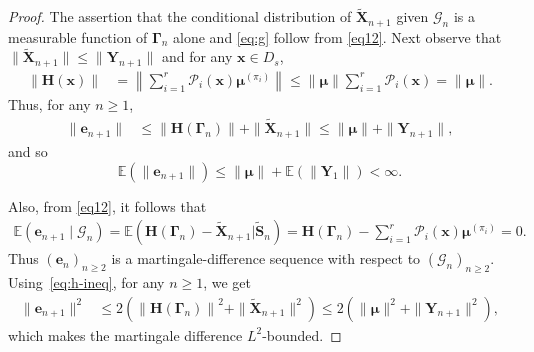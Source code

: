 \documentclass[12pt]{amsart}
\theoremstyle{plain}
\theoremstyle{remark}
\numberwithin{equation}{section}
\begin{document}
\begin{proof} 
{%
The assertion that the conditional distribution of $\boldsymbol{\widetilde{X}}_{n+1}$ given $\mathcal{G}_{n}$ is a measurable function of $\boldsymbol{\Gamma}_{n}$ alone and \eqref{eq:g} follow from \eqref{eq12}. Next observe that $\|\boldsymbol{\widetilde{X}}_{n+1}\| \leq \|\boldsymbol{Y}_{n+1}\|$ and for any $\boldsymbol{x} \in {D}_s$,
\begin{align}\label{eq:h-ineq}
    \|\boldsymbol{H}(\boldsymbol{x})\| &= \left\|\sum_{i=1}^{r}\mathcal{P}_i(\boldsymbol{x})\boldsymbol{\mu}^{(\pi_i)}\right\| \leq \|\boldsymbol{\mu}\| \sum_{i=1}^{r} \mathcal{P}_i(\boldsymbol{x}) = \|\boldsymbol{\mu}\|. 
\end{align}
Thus, for any $n \geq 1$,
\begin{align}\label{eq:e-bound}
    \|\boldsymbol{e}_{n+1}\| &\leq \left\|\boldsymbol{H}\left({\boldsymbol{\Gamma}_n}\right)\right\| + \|\boldsymbol{\widetilde{X}}_{n+1}\| \leq \|\boldsymbol{\mu}\| + \|\boldsymbol{Y}_{n+1}\|,
\end{align}
and so
\[\mathbb{E}\left(\|\boldsymbol{e}_{n+1}\|\right) \leq \|\boldsymbol{\mu}\| +  \mathbb{E}\left(\|\boldsymbol{Y}_1\|\right)< \infty.\]}

Also, from 
\eqref{eq12}, it follows that 
\begin{align*}
    \mathbb{E}\left(\boldsymbol{e}_{n+1} \mid \mathcal{G}_{n}\right) = \mathbb{E}\left(\boldsymbol{H}({\boldsymbol{\Gamma}_n}) - \boldsymbol{\widetilde{X}}_{n+1} \Big| \boldsymbol{\widetilde{S}}_{n}\right) = \boldsymbol{H}({\boldsymbol{\Gamma}_n}) -  \sum_{i=1}^{r}\mathcal{P}_i(\boldsymbol{x})\boldsymbol{\mu}^{(\pi_i)} 
    = 0.
\end{align*}
Thus 
$\left(\boldsymbol{e}_{n}\right)_{n \geq 2}$ is a martingale-difference sequence with respect to $\left(\mathcal{G}_{n}\right)_{n \geq 2}$.
Using~\eqref{eq:h-ineq}, 
for any $n \geq 1$, we get
\begin{align}\label{eq:e-bound2}
    \|\boldsymbol{e}_{n+1}\|^2 &\leq 2\left(\left\|\boldsymbol{H}\left({\boldsymbol{\Gamma}_n}\right)\right\|^2 + \|\boldsymbol{\widetilde{X}}_{n+1}\|^2\right)
   \leq 2\left(\|\boldsymbol{\mu}\|^2 + \|\boldsymbol{Y}_{n+1}\|^2\right),
\end{align}
which makes the martingale difference $L^2$-bounded.


\end{proof}
\end{document}

